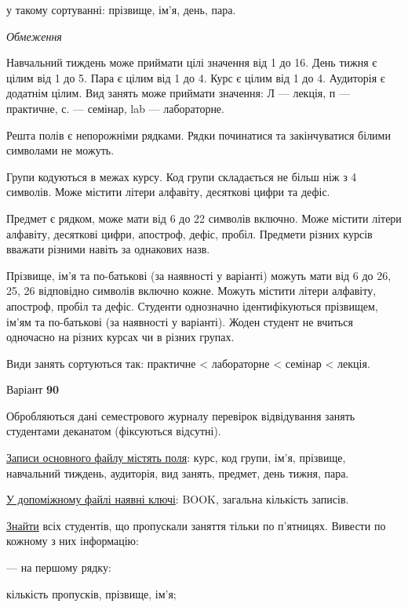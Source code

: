 \documentclass[11pt, ukrainian]{article}
\begin{document}
{\noindent}у такому сортуванні: прізвище, ім’я, день, пара.


\bigskip\textit{Обмеження}

Навчальний тиждень може приймати цілі значення від 1 до 16.
День тижня є цілим від 1 до 5. Пара є цілим від 1 до 4.
Курс є цілим від 1 до 4. Аудиторія є додатнім цілим.
Вид занять може приймати значення:
Л --- лекція, п --- практичне, с. --- семінар, lab --- лабораторне.

Решта полів є непорожніми рядками.
Рядки починатися та закінчуватися білими символами не можуть.

Групи кодуються в межах курсу.
Код групи складається не більш ніж з 4 символів.
Може містити літери алфавіту, десяткові цифри та дефіс.

Предмет є рядком, може мати від 6 до 22 символів включно.
Може містити літери алфавіту, десяткові цифри, апостроф, дефіс, пробіл.
Предмети різних курсів вважати різними навіть за однакових назв.

Прізвище, ім’я та по-батькові (за наявності у варіанті)
можуть мати від 6 до 26, 25, 26 відповідно символів включно кожне.
Можуть містити літери алфавіту, апостроф, пробіл та дефіс.
Студенти однозначно ідентифікуються прізвищем, ім’ям та по-батькові (за наявності у варіанті).
Жоден студент не вчиться одночасно на різних курсах чи в різних групах.

Види занять сортуються так: практичне < лабораторне < семінар < лекція.





\par
\newpage
{\center Варіант  \No \textbf { 90 }\par}
\bigskip
Обробляються дані семестрового журналу перевірок відвідування занять студентами деканатом (фіксуються відсутні). 

\underline{Записи основного файлу містять поля}: курс, код групи, ім’я, прізвище, навчальний тиждень, аудиторія, вид занять, предмет, день тижня, пара.

\underline{У допоміжному файлі наявні ключі}: BOOK, загальна кількість записів.

\underline{Знайти} всіх студентів, що пропускали заняття тільки по п’ятницях. Вивести по кожному з них інформацію:\par
{\noindent}--- на першому рядку:\par
кількість пропусків, прізвище, ім’я;
\end{document}
